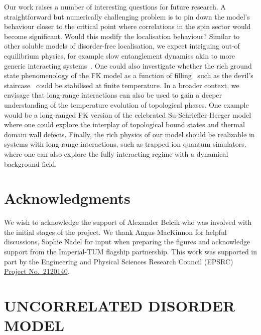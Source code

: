 Our work raises a number of interesting questions for future research. A straightforward but numerically challenging problem is to pin down the model's behaviour closer to the critical point where correlations in the spin sector would become significant. Would this modify the localisation behaviour? Similar to other soluble models of disorder-free localisation, we expect intriguing out-of equilibrium physics, for example slow entanglement dynamics akin to more generic interacting systems~\autocite{hartLogarithmicEntanglementGrowth2020}. One could also investigate whether the rich ground state phenomenology of the FK model as a function of filling~\autocite{gruberGroundStatesSpinless1990} such as the devil's staircase~\autocite{michelettiCompleteDevilTextquotesingles1997} could be stabilised at finite temperature. In a broader context, we envisage that long-range interactions can also be used to gain a deeper understanding of the temperature evolution of topological phases. One example would be a long-ranged FK version of the celebrated Su-Schrieffer-Heeger model where one could explore the interplay of topological bound states and thermal domain wall defects. Finally, the rich physics of our model should be realizable in systems with long-range interactions, such as trapped ion quantum simulators, where one can also explore the fully interacting regime with a dynamical background field.

\hypertarget{acknowledgments}{%
\section{Acknowledgments}\label{acknowledgments}}

We wish to acknowledge the support of Alexander Belcik who was involved with the initial stages of the project. We thank Angus MacKinnon for helpful discussions, Sophie Nadel for input when preparing the figures and acknowledge support from the Imperial-TUM flagship partnership. This work was supported in part by the Engineering and Physical Sciences Research Council (EPSRC) \href{https://gtr.ukri.org/project/145404DD-ABAD-4CFB-A2D8-152A6AFCCEB7\#/tabOverview}{Project No.~2120140}.

\hypertarget{uncorrelated-disorder-model}{%
\section[ UNCORRELATED DISORDER MODEL]{\texorpdfstring{\protect\hypertarget{app:disorder_model}{}{} UNCORRELATED DISORDER MODEL}{ UNCORRELATED DISORDER MODEL}}\label{uncorrelated-disorder-model}}

